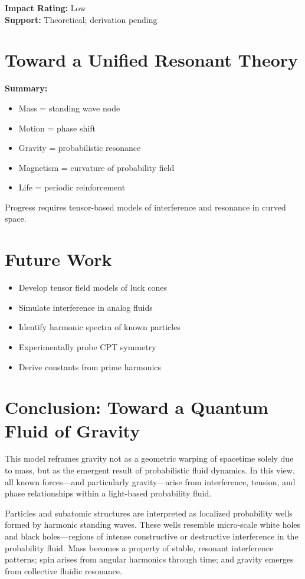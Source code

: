 \documentclass[12pt]{article}
\begin{document}
\textbf{Impact Rating:} Low\\
\textbf{Support:} Theoretical; derivation pending

\section{Toward a Unified Resonant Theory}
\textbf{Summary:}
\begin{itemize}
 \item Mass = standing wave node
 \item Motion = phase shift
 \item Gravity = probabilistic resonance
 \item Magnetism = curvature of probability field
 \item Life = periodic reinforcement
\end{itemize}
Progress requires tensor-based models of interference and resonance in curved space.

\section{Future Work}
\begin{itemize}
 \item Develop tensor field models of luck cones
 \item Simulate interference in analog fluids
 \item Identify harmonic spectra of known particles
 \item Experimentally probe CPT symmetry
 \item Derive constants from prime harmonics
\end{itemize}

\section{Conclusion: Toward a Quantum Fluid of Gravity}
This model reframes gravity not as a geometric warping of spacetime solely due to mass, but as the emergent result of probabilistic fluid dynamics. In this view, all known forces---and particularly gravity---arise from interference, tension, and phase relationships within a light-based probability fluid.

Particles and subatomic structures are interpreted as localized probability wells formed by harmonic standing waves. These wells resemble micro-scale white holes and black holes---regions of intense constructive or destructive interference in the probability fluid. Mass becomes a property of stable, resonant interference patterns; spin arises from angular harmonics through time; and gravity emerges from collective fluidic resonance.
\end{document}
